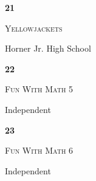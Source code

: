 \documentclass[extrafontsizes,30pt]{memoir}
\begin{document}
\newpage



\renewcommand{\TeamID}{21}
\renewcommand{\TeamName}{Yellowjackets}
\renewcommand{\SchoolName}{Horner Jr. High School}

\begin{center}
\mbox{}
\vspace{1in}

{\Huge \textbf{ \TeamID}}

\vspace{1in}

{\Large \textsc{\TeamName}}

\vspace{1in}

{\large \SchoolName}
\end{center}

\newpage



\renewcommand{\TeamID}{22}
\renewcommand{\TeamName}{Fun With Math 5}
\renewcommand{\SchoolName}{Independent}

\begin{center}
\mbox{}
\vspace{1in}

{\Huge \textbf{ \TeamID}}

\vspace{1in}

{\Large \textsc{\TeamName}}

\vspace{1in}

{\large \SchoolName}
\end{center}

\newpage



\renewcommand{\TeamID}{23}
\renewcommand{\TeamName}{Fun With Math 6}
\renewcommand{\SchoolName}{Independent}

\begin{center}
\mbox{}
\vspace{1in}

{\Huge \textbf{ \TeamID}}

\vspace{1in}

{\Large \textsc{\TeamName}}

\vspace{1in}

{\large \SchoolName}
\end{center}

\newpage
\end{document}
